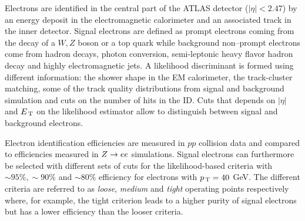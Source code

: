 Electrons are identified in the central part of the ATLAS detector
($|\eta| < 2.47$) by an energy deposit in the electromagnetic calorimeter and an
associated track in the inner detector. Signal electrons are defined as prompt
electrons coming from the decay of a $W, Z$ boson or a top quark while
background non--prompt electrons come from hadron decays, photon conversion,
semi-leptonic heavy flavor hadron decay and highly electromagnetic jets. A
likelihood discriminant is formed using different information: the shower shape
in the EM calorimeter, the track-cluster matching, some of the track quality
distributions from signal and background simulation and cuts on the number of
hits in the ID\@. Cuts that depends on $|\eta|$ and $E_\mathrm{\, T}$ on the likelihood
estimator allow to distinguish between signal and background electrons.

Electron identification efficiencies are measured in $pp$ collision data and
compared to efficiencies measured in $Z \to e e$ simulations. Signal electrons can
furthermore be selected with different sets of cuts for the likelihood-based
criteria with $\sim 95\%, \sim 90\%$ and $\sim 80\%$ efficiency for electrons
with $p_\mathrm{\, T} = 40~$GeV. The different criteria are referred to as \emph{loose},
\emph{medium} and \emph{tight} operating points respectively~\cite{ATL-EL-IDENT}
where, for example, the tight criterion leads to a higher purity of signal
electrons but has a lower efficiency than the looser criteria.

